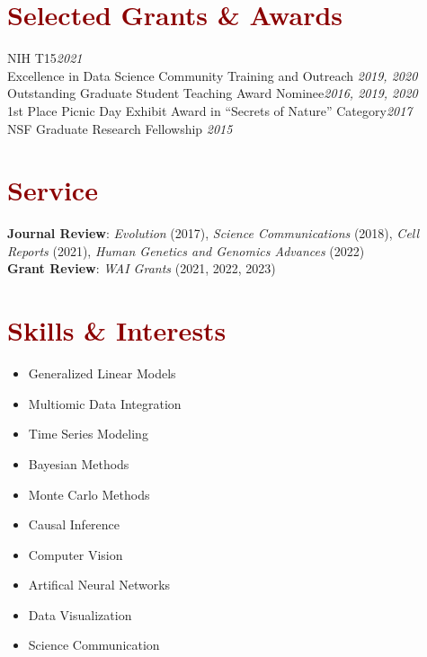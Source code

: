 \documentclass[11pt,margin,line]{resume}
\begin{document}
\begin{resume}
\section{\large\textcolor{DarkRed}{Selected Grants \& Awards}}
NIH T15\hfill \emph{2021}\\
Excellence in Data Science Community Training and Outreach \hfill \emph{2019, 2020}\\
Outstanding Graduate Student Teaching Award Nominee\hfill \emph{2016, 2019, 2020}\\
1st Place Picnic Day Exhibit Award in “Secrets of Nature” Category\hfill \emph{2017}\\
NSF Graduate Research Fellowship \hfill \emph{2015}\\

\vspace{-5mm}
\section{\large\textcolor{DarkRed}{Service}}
\textbf{Journal Review}: \emph{Evolution} (2017),  \emph{Science Communications} (2018),  \emph{Cell Reports} (2021), \emph{Human Genetics and Genomics Advances} (2022)\\
\textbf{Grant Review}: \emph{WAI Grants} (2021,  2022,  2023)

\section{\large\textcolor{DarkRed}{Skills \& Interests}}


\vspace{-0.0mm}
\begin{multicols}{2}
    \begin{itemize}
    \setlength\itemsep{-0.2em}
         \item Generalized Linear Models
         \item Multiomic Data Integration
	\item Time Series Modeling
	\item Bayesian Methods
         \item Monte Carlo Methods
         \item Causal Inference
         \item Computer Vision
         \item Artifical Neural Networks
         \item Data Visualization
         \item Science Communication
    \end{itemize}
    \end{multicols}\vspace{-4.5mm}


\end{resume}
\end{document}
